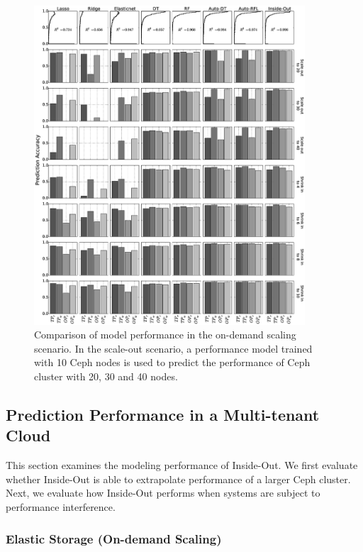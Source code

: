 \begin{figure}
    \centering
    \includegraphics[width=0.9\textwidth]{Chapter-InsideOut/figures/unseen_scale_all_new.eps}
    \caption{Comparison of model performance in the on-demand scaling scenario. In the scale-out scenario, a performance model trained with 10 Ceph nodes is used to predict the performance of Ceph cluster with 20, 30 and 40 nodes.}
    \label{fig:elasticity}
\end{figure}


\subsection{Prediction Performance in a Multi-tenant Cloud}

This section examines the modeling performance of Inside-Out.
We first evaluate whether Inside-Out is able to extrapolate
performance of a larger Ceph cluster. 
Next, we evaluate how Inside-Out performs
when systems are subject to performance interference.

\subsubsection{Elastic Storage (On-demand Scaling)}
\label{sec:scaleout_prediction}

